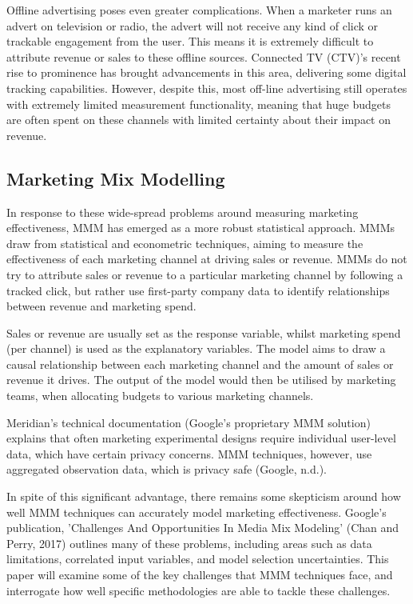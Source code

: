 \documentclass[11pt, a4paper]{article}
\begin{document}
Offline advertising poses even greater complications. When a marketer runs an advert on television or radio, the advert will not receive any kind of click or trackable engagement from the user. This means it is extremely difficult to attribute revenue or sales to these offline sources. Connected TV (CTV)'s recent rise to prominence has brought advancements in this area, delivering some digital tracking capabilities. However, despite this, most off-line advertising still operates with extremely limited measurement functionality, meaning that huge budgets are often spent on these channels with limited certainty about their impact on revenue.

\subsection{Marketing Mix Modelling}
In response to these wide-spread problems around measuring marketing effectiveness, MMM has emerged as a more robust statistical approach. MMMs draw from statistical and econometric techniques, aiming to measure the effectiveness of each marketing channel at driving sales or revenue. 
MMMs do not try to attribute sales or revenue to a particular marketing channel by following a tracked click, but rather use first-party company data to identify relationships between revenue and marketing spend. 


Sales or revenue are usually set as the response variable, whilst marketing spend (per channel) is used as the explanatory variables. The model aims to draw a causal relationship between each marketing channel and the amount of sales or revenue it drives. The output of the model would then be utilised by marketing teams, when allocating budgets to various marketing channels. 

Meridian's technical documentation (Google's proprietary MMM solution) explains that often marketing experimental designs require individual user-level data, which have certain privacy concerns. MMM techniques, however, use aggregated observation data, which is privacy safe (Google, n.d.). 

In spite of this significant advantage, there remains some skepticism around how well MMM techniques can accurately model marketing effectiveness. Google's publication, 'Challenges And Opportunities In Media Mix Modeling' (Chan and Perry, 2017) outlines many of these problems, including areas such as data limitations, correlated input variables, and model selection uncertainties. This paper will examine some of the key challenges that MMM techniques face, and interrogate how well specific methodologies are able to tackle these challenges. 
\end{document}
